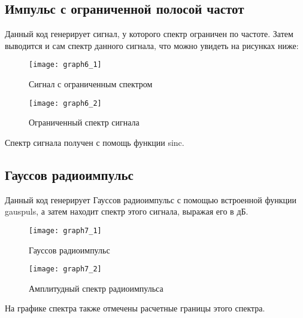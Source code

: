 \subsection{Импульс с ограниченной полосой частот}


\parindent=1cm
Данный код генерирует сигнал, у которого спектр ограничен по частоте. Затем выводится и сам спектр данного сигнала, что можно увидеть на рисунках ниже:

\begin{figure}[H]
	\begin{center}
		\texttt{[image: graph6\_1]}
		\caption{Сигнал с ограниченным спектром} 
		\label{pic:graph6_1} %
	\end{center}
\end{figure}
\begin{figure}[H]
	\begin{center}
		\texttt{[image: graph6\_2]}
		\caption{Ограниченный спектр сигнала} 
		\label{pic:graph6_2} %
	\end{center}
\end{figure}
Спектр сигнала получен с помощь функции sinc.

\subsection{Гауссов радиоимпульс}


\parindent=1cm
Данный код генерирует Гауссов радиоимпульс с помощью встроенной функции gauspuls, а затем находит спектр этого сигнала, выражая его в дБ.

\begin{figure}[H]
	\begin{center}
		\texttt{[image: graph7\_1]}
		\caption{Гауссов радиоимпульс} 
		\label{pic:graph7_1} %
	\end{center}
\end{figure}
\begin{figure}[H]
	\begin{center}
		\texttt{[image: graph7\_2]}
		\caption{Амплитудный спектр радиоимпульса} 
		\label{pic:graph7_2} %
	\end{center}
\end{figure}
На графике спектра также отмечены расчетные границы этого спектра.

